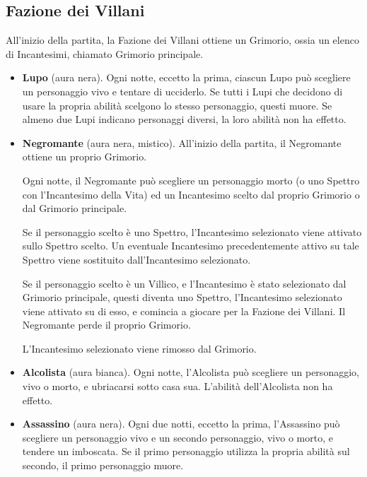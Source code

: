 \documentclass[a4paper,10pt]{article}
\begin{document}
\subsection*{Fazione dei Villani}

All'inizio della partita, la Fazione dei Villani ottiene un Grimorio, ossia un elenco di Incantesimi, chiamato Grimorio principale.

\begin{itemize}
	
	\item {\bf Lupo} (aura nera). Ogni notte, eccetto la prima, ciascun Lupo può scegliere un personaggio vivo e tentare di ucciderlo. Se tutti i Lupi che decidono di usare la propria abilità scelgono lo stesso personaggio, questi muore. Se almeno due Lupi indicano personaggi diversi, la loro abilità non ha effetto.
	
	\item {\bf Negromante} (aura nera, mistico). All'inizio della partita, il Negromante ottiene un proprio Grimorio.
	
	Ogni notte, il Negromante può scegliere un personaggio morto (o uno Spettro con l'Incantesimo della Vita) ed un Incantesimo scelto dal proprio Grimorio o dal Grimorio principale.

    Se il personaggio scelto è uno Spettro, l'Incantesimo selezionato viene attivato sullo Spettro scelto. Un eventuale Incantesimo precedentemente attivo su tale Spettro viene sostituito dall'Incantesimo selezionato. %

    Se il personaggio scelto è un Villico, e l'Incantesimo è stato selezionato dal Grimorio principale, questi diventa uno Spettro, l'Incantesimo selezionato viene attivato su di esso, e comincia a giocare per la Fazione dei Villani. Il Negromante perde il proprio Grimorio.

	L'Incantesimo selezionato viene rimosso dal Grimorio.

	\item {\bf Alcolista} (aura bianca). Ogni notte, l'Alcolista può scegliere un personaggio, vivo o morto, e ubriacarsi sotto casa sua. L'abilità dell'Alcolista non ha effetto.
	
	\item {\bf Assassino} (aura nera). Ogni due notti, eccetto la prima, l'Assassino può scegliere un personaggio vivo e un secondo personaggio, vivo o morto, e tendere un imboscata. Se il primo personaggio utilizza la propria abilità sul secondo, il primo personaggio muore.


\end{itemize}
\end{document}
